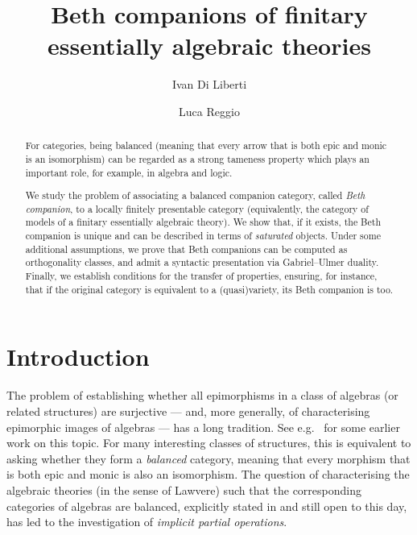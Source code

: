 \documentclass[a4paper,10pt,reqno]{amsart}
\title{Beth companions of finitary essentially algebraic theories}
\author{Ivan Di Liberti}
\author{Luca Reggio}
\theoremstyle{definition}
\theoremstyle{remark}
\begin{document}
\begin{abstract}
For categories, being balanced (meaning that every arrow that is both epic and monic is an isomorphism) can be regarded as a strong tameness property which plays an important role, for example, in algebra and logic.

We study the problem of associating a balanced companion category, called \emph{Beth companion}, to a locally finitely presentable category (equivalently, the category of models of a finitary essentially algebraic theory). We show that, if it exists, the Beth companion is unique and can be described in terms of \emph{saturated} objects. Under some additional assumptions, we prove that Beth companions can be computed as orthogonality classes, and admit a syntactic presentation via Gabriel--Ulmer duality. Finally, we establish conditions for the transfer of properties, ensuring, for instance, that if the original category is equivalent to a (quasi)variety, its Beth companion is too.
\end{abstract}


\maketitle


   {
   \hypersetup{linkcolor=black}
   \tableofcontents
   }


\section{Introduction}

The problem of establishing whether all epimorphisms in a class of algebras (or related structures) are surjective --- and, more generally, of characterising epimorphic images of algebras --- has a long tradition. See e.g.\ \cite{Isbell1966,HI1967,Storrer1968,SAC1968,Reid1969} for some earlier work on this topic. For many interesting classes of structures, this is equivalent to asking whether they form a \emph{balanced} category, meaning that every morphism that is both epic and monic is also an isomorphism. The question of characterising the algebraic theories (in the sense of Lawvere) such that the corresponding categories of algebras are balanced, explicitly stated in \cite[p.~57]{Lawvere1968} and still open to this day, has led to the investigation of \emph{implicit partial operations}. 
\end{document}
